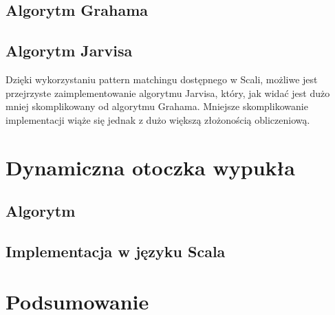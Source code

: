    		\section{Algorytm Grahama}
   		
   		\newpage
   		
   		\newpage
   		
   		
   		\section{Algorytm Jarvisa}
   		Dzięki wykorzystaniu pattern matchingu dostępnego w Scali, możliwe jest przejrzyste zaimplementowanie algorytmu Jarvisa, który, jak widać jest dużo mniej skomplikowany od algorytmu Grahama. Mniejsze skomplikowanie implementacji wiąże się jednak z dużo większą złożonością obliczeniową.
        
        
    \chapter{Dynamiczna otoczka wypukła}
    	\section{Algorytm}
    	\section{Implementacja w języku Scala} 
	\chapter{Podsumowanie} 
      
    

